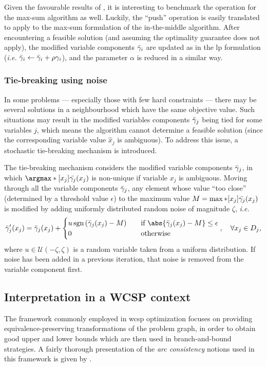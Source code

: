 Given the favourable results of \textcite{Bastert10}, it is interesting to benchmark the operation for the max-sum algorithm as well.
Luckily, the \enquote{push} operation is easily translated to apply to the max-sum formulation of the in-the-middle algorithm.
After encountering a feasible solution (and assuming the optimality guarantee does not apply), the modified variable components \(\bar{\gamma}_i\) are updated as in the \gls{lp} formulation (\emph{i.e.} \(\bar{\gamma}_i\leftarrow\bar{\gamma}_i+\rho\gamma_i\)), and the parameter \(\alpha\) is reduced in a similar way.

\subsubsection{Tie-breaking using noise}
In some problems --- especially those with few hard constraints --- there may be several solutions in a neighbourhood which have the same objective value.
Such situations may result in the modified variables components \(\bar{\gamma}_j\) being tied for some variables \(j\), which means the algorithm cannot determine a feasible solution (since the corresponding variable value \(\hat{x}_j\) is ambiguous).
To address this issue, a stochastic tie-breaking mechanism is introduced.

The tie-breaking mechanism considers the modified variable components \(\bar{\gamma}_j\), in which \(\argmax*[x_j]{\bar{\vcomp_j}(x_j)}\) is non-unique if variable \(x_j\) is ambiguous.
Moving through all the variable components \(\bar{\gamma}_j\), any element whose value \enquote{too close} (determined by a threshold value \(\epsilon\)) to the maximum value \(M = \max*[x_j]{\bar{\ensuremath{\gamma}_j}(x_j)}\) is modified by adding uniformly distributed random noise of magnitude \(\zeta\), \emph{i.e.}
\begin{equation*}
	\bar{\vcomp}'_j(x_j) = \bar{\vcomp}_j(x_j) + \begin{cases}
		u \sgn{\bar{\vcomp}_j(x_j) - M} \quad & \text{if \(\abs{\bar{\vcomp}_j(x_j) - M} \leq \epsilon\)} \\
		0 & \text{otherwise}
	\end{cases}, \quad \forall x_j \in D_j,
\end{equation*}
where \(u \in \mathcal{U}(-\zeta,\zeta)\) is a random variable taken from a uniform distribution.
If noise has been added in a previous iteration, that noise is removed from the variable component first.

\subsection{Interpretation in a WCSP context}
The framework commonly employed in \gls{wcsp} optimization focuses on providing equivalence-preserving transformations of the problem graph, in order to obtain good upper and lower bounds which are then used in branch-and-bound strategies.
A fairly thorough presentation of the \emph{arc consistency} notions used in this framework is given by \textcite{Cooper10}.

